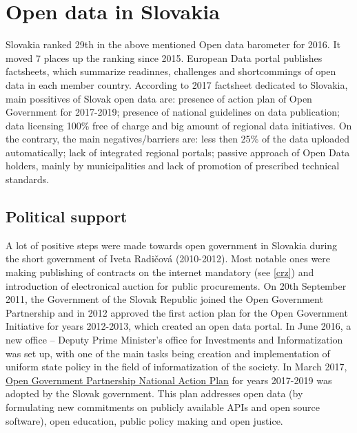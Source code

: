 \documentclass[thesis=B,english]{FITthesis}[2012/06/26]
\begin{document}
\chapter{Open data in Slovakia}
	Slovakia ranked 29th in the above mentioned Open data barometer for 2016. It moved 7 places up the ranking since 2015. European Data portal publishes factsheets, which summarize readinnes, challenges and shortcommings of open data in each member country. According to 2017 factsheet dedicated to Slovakia, main possitives of Slovak open data are: presence of action plan of Open Government for 2017-2019; presence of national guidelines on data publication; data licensing 100\% free of charge and big amount of regional data initiatives. On the contrary, the main negatives/barriers are: less then 25\% of the data uploaded automatically; lack of integrated regional portals; passive approach of Open Data holders, mainly by municipalities and lack of promotion of prescribed technical standards. \cite{eudataportalfactsheet}
	\section{Political support}
	A lot of positive steps were made towards open government in Slovakia during the short government of Iveta Radičová (2010-2012). Most notable ones were making publishing of contracts on the internet mandatory (see \ref{crz}) and introduction of electronical auction for public procurements. On 20th September 2011, the Government of the Slovak Republic joined the Open Government Partnership and in 2012 approved the first  action plan for the Open Government Initiative for years 2012-2013, which created an open data portal. In June 2016, a new  office -- Deputy Prime Minister's office for Investments and Informatization was set up, with one of the main tasks being creation and implementation of uniform state policy in the field of informatization of the society. In March 2017, \href{https://www.opengovpartnership.org/sites/default/files/Slovakia_NAP_2017-2019_EN.pdf}{Open Government Partnership National Action Plan} for years 2017-2019 was adopted by the Slovak government. This plan addresses open data (by formulating new commitments on publicly available APIs and open source software), open education, public policy making and open justice.
\end{document}
